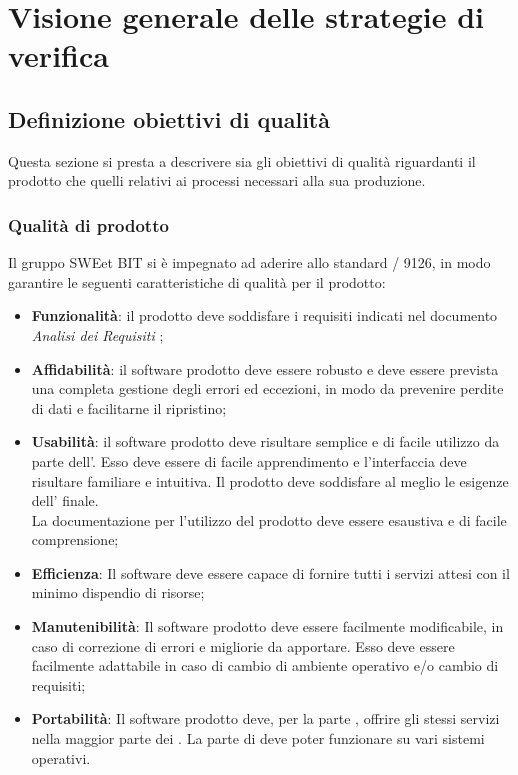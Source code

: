 \section{Visione generale delle strategie di verifica}
  \subsection{Definizione obiettivi di qualità}
  Questa sezione si presta a descrivere sia gli obiettivi di qualità riguardanti il prodotto
  che quelli relativi ai processi necessari alla sua produzione.
    \subsubsection{Qualità di prodotto}
    Il gruppo SWEet BIT si è impegnato ad aderire allo standard / 9126, in modo garantire
    le seguenti caratteristiche di qualità per il prodotto:
    \begin{itemize}
      \item \textbf{Funzionalità}: il prodotto deve soddisfare i requisiti indicati nel documento \emph{Analisi dei Requisiti \VersioneAR{}};

      \item \textbf{Affidabilità}: il software prodotto deve essere robusto e deve essere prevista una completa gestione degli errori ed eccezioni,
       in modo da prevenire perdite di dati e facilitarne il ripristino;

      \item \textbf{Usabilità}: il software prodotto deve risultare semplice e di facile utilizzo da parte dell'.
      Esso deve essere di facile apprendimento e l'interfaccia  deve risultare familiare e intuitiva. Il prodotto deve soddisfare al meglio le esigenze dell' finale. \\
      La documentazione per l'utilizzo del prodotto deve essere esaustiva e di facile comprensione;

      \item \textbf{Efficienza}: Il software deve essere capace di fornire tutti i servizi attesi con il minimo dispendio di risorse;

      \item \textbf{Manutenibilità}: Il software prodotto deve essere facilmente modificabile, in caso di correzione di errori e migliorie da apportare. Esso deve essere facilmente
      adattabile in caso di cambio di ambiente operativo e/o cambio di requisiti;

      \item \textbf{Portabilità}: Il software prodotto deve, per la parte , offrire gli stessi servizi nella maggior parte dei .
      La parte di  deve poter funzionare su vari sistemi operativi.
    \end{itemize}

